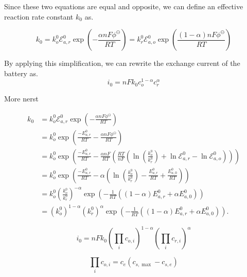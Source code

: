 \documentclass[lettersize,journal]{IEEEtran}
\begin{document}
\noindent Since these two equations are equal and opposite, we can define an effective reaction rate constant $k_0$ as.

\begin{equation}
k_{0}=k_{o}^{0} \mathscr{E}_{a, r}^{0} \exp \left(-\frac{\alpha n F \phi^{\ominus}}{R T}\right)=k_{r}^{0} \mathscr{E}_{a, o}^{0} \exp \left(\frac{(1-\alpha) n F \phi^{\ominus}}{R T}\right)
\end{equation}

\noindent By applying this simplification, we can rewrite the exchange current of the battery as.
\begin{equation}
i_{0}=n F k_{0} c_{o}^{1-\alpha} c_{r}^{\alpha}
\end{equation}

\noindent More nerst

\begin{equation}
\begin{aligned}
k_{0} &=k_{o}^{0} \mathscr{E}_{a, r}^{0} \exp \left(-\frac{\alpha n F \phi^{\ominus}}{R T}\right) \\
&=k_{o}^{0} \exp \left(\frac{-E_{a, r}^{0}}{R T}-\frac{\alpha n F \phi^{\ominus}}{R T}\right) \\
&=k_{o}^{0} \exp \left(\frac{-E_{a, r}^{0}}{R T}-\frac{\alpha n F}{R T}\left(\frac{R T}{n F}\left(\ln \left(\frac{k_{o}^{0}}{k_{r}^{0}}\right)+\ln \mathscr{E}_{a, r}^{0}-\ln \mathscr{E}_{a, o}^{0}\right)\right)\right) \\
&=k_{o}^{0} \exp \left(\frac{-E_{a, r}^{0}}{R T}-\alpha\left(\ln \left(\frac{k_{o}^{0}}{k_{r}^{0}}\right)-\frac{E_{a, r}^{0}}{R T}+\frac{E_{a, 0}^{0}}{R T}\right)\right) \\
&=k_{o}^{0}\left(\frac{k_{o}^{0}}{k_{r}^{0}}\right)^{-\alpha} \exp \left(-\frac{1}{R T}\left((1-\alpha) E_{a, r}^{0}+\alpha E_{a, 0}^{0}\right)\right) \\
&=\left(k_{o}^{0}\right)^{1-\alpha}\left(k_{r}^{0}\right)^{\alpha} \exp \left(-\frac{1}{R T}\left((1-\alpha) E_{a, r}^{0}+\alpha E_{a, 0}^{0}\right)\right) .
\end{aligned}
\end{equation}


\begin{equation}
i_{0}=n F k_{0}\left(\prod_{i} c_{o, i}\right)^{1-\alpha}\left(\prod_{i} c_{r, i}\right)^{\alpha}
\end{equation}

\begin{equation}
\prod_{i} c_{o, i}=c_{e}\left(c_{s, \max }-c_{s, e}\right)
\end{equation}
\end{document}
